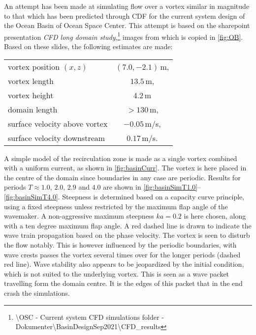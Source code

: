 \documentclass[a4paper,12pt]{article}
\let\underscore\_
\renewcommand{\_}[1]{_\mr{#1}}
\begin{document}
An attempt has been made at simulating flow over a vortex similar in magnitude to that which has been predicted through CDF for the current system design of the Ocean Basin of Ocean Space Center. 
This attempt is based on the sharepoint presentation \textit{CFD long domain study},\footnote{{\textbackslash}OSC - Current system CFD simulations folder - Dokumenter{\textbackslash}BasinDesignSep2021{\textbackslash}CFD{\underscore}results}
images from which is copied in \autoref{fig:OB}.
Based on these slides, the following estimates are made:
\begin{center}
\begin{tabular}{lc}
vortex position $(x,z)$ & $(7.0,-2.1)$\,m,\\
vortex length		& $13.5$\,m,\\
vortex height & 4.2\,m\\
domain length 	& $>130$\,m,\\
surface velocity above vortex & $-0.05$\,m/s,\\
surface velocity downstream & $0.17$\,m/s.
\end{tabular}
\end{center}




\par
A simple model of the recirculation zone is made as 
a single vortex combined with a uniform current, as shown in \autoref{fig:basinCurr}. 
The vortex is here placed in the centre of the domain since boundaries in any case are periodic.
%
Results for periods $T\approx 1.0$, $2.0$, $2.9$ and $4.0$ are shown in 
\autoref{fig:basinSimT1.0}--\ref{fig:basinSimT4.0}.
Steepness is determined based on a capacity curve principle, using a fixed steepness unless restricted by the maximum flap angle of the wavemaker. 
A non-aggressive maximum steepness $ka=0.2$ is here chosen, along with a ten degree maximum flap angle.
A red dashed line is drawn to indicate the wave train propagation based on the phase velocity.
The vortex is seen to disturb the flow notably.
This is however influenced by the periodic boundaries, with wave crests passes the vortex several times over for the longer periods (dashed red line).
Wave stability also appears to be jeopardized by the initial condition, which is not suited to the underlying vortex. 
This is seen as a wave packet travelling form the domain centre.
It is the edges of this packet that in the end crash the simulations.
\end{document}
